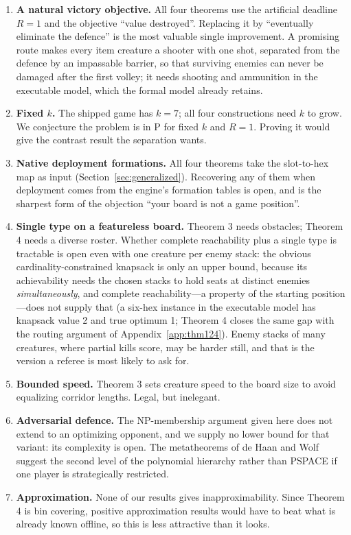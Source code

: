 \documentclass[11pt,a4paper]{article}
\theoremstyle{plain}
\theoremstyle{definition}
\theoremstyle{plain}
\theoremstyle{definition}
\theoremstyle{remark}
\begin{document}
\begin{enumerate}
\item \textbf{A natural victory objective.} All four theorems use the artificial deadline $R=1$
  and the objective ``value destroyed''. Replacing it by ``eventually eliminate the defence'' is
  the most valuable single improvement. A promising route makes every item creature a shooter
  with one shot, separated from the defence by an impassable barrier, so that surviving enemies
  can never be damaged after the first volley; it needs shooting and ammunition in the executable
  model, which the formal model already retains.
\item \textbf{Fixed $k$.} The shipped game has $k=7$; all four constructions need $k$ to grow. We
  conjecture the problem is in P for fixed $k$ and $R=1$. Proving it would give the contrast
  result the separation wants.
\item \textbf{Native deployment formations.} All four theorems take the slot-to-hex map as input
  (Section~\ref{sec:generalized}). Recovering any of them when deployment comes from the engine's
  formation tables is open, and is the sharpest form of the objection ``your board is not a game
  position''.
\item \textbf{Single type on a featureless board.} Theorem 3 needs obstacles; Theorem 4 needs a
  diverse roster. Whether complete reachability plus a single type is tractable is open even
  with one creature per enemy stack: the obvious cardinality-constrained knapsack is only an
  upper bound, because its achievability needs the chosen stacks to hold seats at distinct
  enemies \emph{simultaneously}, and complete reachability---a property of the starting
  position---does not supply that (a six-hex instance in the executable model has knapsack
  value 2 and true optimum 1; Theorem 4 closes the same gap with the routing argument of
  Appendix~\ref{app:thm124}). Enemy stacks of many creatures, where partial kills score, may
  be harder still, and that is the version a referee is most likely to ask for.
\item \textbf{Bounded speed.} Theorem 3 sets creature speed to the board size to avoid equalizing
  corridor lengths. Legal, but inelegant.
\item \textbf{Adversarial defence.} The NP-membership argument given here does not extend to an
  optimizing opponent, and we supply no lower bound for that variant: its complexity is open.
  The metatheorems of de Haan and Wolf~\cite{dHW18} suggest the second
  level of the polynomial hierarchy rather than PSPACE if one player is strategically restricted.
\item \textbf{Approximation.} None of our results gives inapproximability. Since Theorem 4 is bin
  covering, positive approximation results would have to beat what is already known offline, so
  this is less attractive than it looks.
\end{enumerate}
\end{document}
